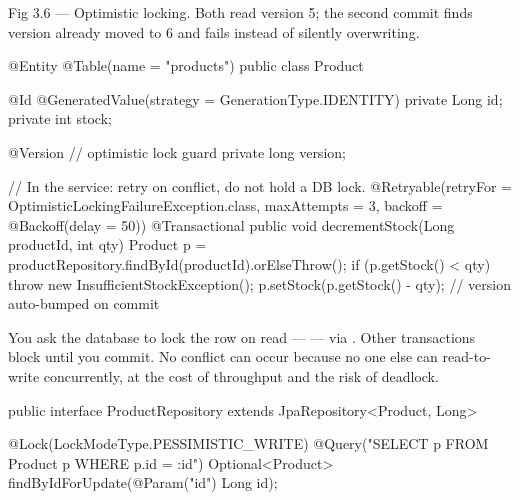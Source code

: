 \begin{wbfigure}{Fig 3.6 — Optimistic locking. Both read version 5; the second commit finds version already moved to 6 and fails instead of silently overwriting.}
\end{wbfigure}

\begin{javabox}
@Entity @Table(name = "products")
public class Product {
  @Id @GeneratedValue(strategy = GenerationType.IDENTITY)
  private Long id;
  private int stock;

  @Version                 // optimistic lock guard
  private long version;
}

// In the service: retry on conflict, do not hold a DB lock.
@Retryable(retryFor = OptimisticLockingFailureException.class,
           maxAttempts = 3, backoff = @Backoff(delay = 50))
@Transactional
public void decrementStock(Long productId, int qty) {
  Product p = productRepository.findById(productId).orElseThrow();
  if (p.getStock() < qty) throw new InsufficientStockException();
  p.setStock(p.getStock() - qty);   // version auto-bumped on commit
}
\end{javabox}

 You ask the database to lock the row on read ---  --- via . Other transactions block until you commit. No conflict can occur because no one else can read-to-write concurrently, at the cost of throughput and the risk of deadlock.

\begin{javabox}
public interface ProductRepository extends JpaRepository<Product, Long> {

  @Lock(LockModeType.PESSIMISTIC_WRITE)
  @Query("SELECT p FROM Product p WHERE p.id = :id")
  Optional<Product> findByIdForUpdate(@Param("id") Long id);
}
\end{javabox}

